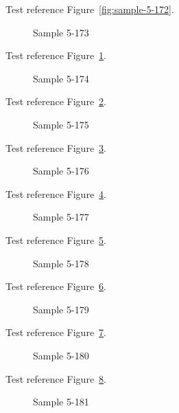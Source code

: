 Test reference Figure~\ref{fig:sample-5-172}.

\begin{figure}[tbhp]
\caption{Sample 5-173}
\label{fig:sample-5-173}
\end{figure}

Test reference Figure~\ref{fig:sample-5-173}.

\begin{figure}[tbhp]
\caption{Sample 5-174}
\label{fig:sample-5-174}
\end{figure}

Test reference Figure~\ref{fig:sample-5-174}.

\begin{figure}[tbhp]
\caption{Sample 5-175}
\label{fig:sample-5-175}
\end{figure}

Test reference Figure~\ref{fig:sample-5-175}.

\begin{figure}[tbhp]
\caption{Sample 5-176}
\label{fig:sample-5-176}
\end{figure}

Test reference Figure~\ref{fig:sample-5-176}.

\begin{figure}[tbhp]
\caption{Sample 5-177}
\label{fig:sample-5-177}
\end{figure}

Test reference Figure~\ref{fig:sample-5-177}.

\begin{figure}[tbhp]
\caption{Sample 5-178}
\label{fig:sample-5-178}
\end{figure}

Test reference Figure~\ref{fig:sample-5-178}.

\begin{figure}[tbhp]
\caption{Sample 5-179}
\label{fig:sample-5-179}
\end{figure}

Test reference Figure~\ref{fig:sample-5-179}.

\begin{figure}[tbhp]
\caption{Sample 5-180}
\label{fig:sample-5-180}
\end{figure}

Test reference Figure~\ref{fig:sample-5-180}.

\begin{figure}[tbhp]
\caption{Sample 5-181}
\label{fig:sample-5-181}
\end{figure}


